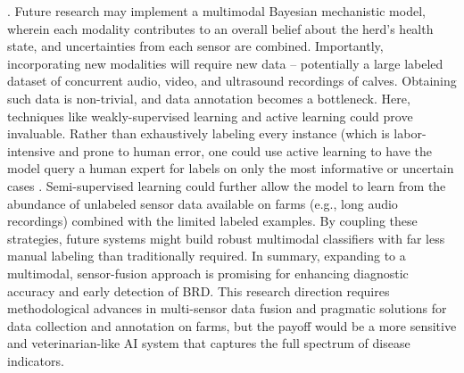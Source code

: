 \cite{carpentier2018automatic}. Future research may implement a multimodal Bayesian mechanistic model, wherein each modality contributes to an overall belief about the herd’s health state, and uncertainties from each sensor are combined. Importantly, incorporating new modalities will require new data – potentially a large labeled dataset of concurrent audio, video, and ultrasound recordings of calves. Obtaining such data is non-trivial, and data annotation becomes a bottleneck. Here, techniques like weakly-supervised learning and active learning could prove invaluable. Rather than exhaustively labeling every instance (which is labor-intensive and prone to human error, one could use active learning to have the model query a human expert for labels on only the most informative or uncertain cases \cite{gal2017deep}. Semi-supervised learning could further allow the model to learn from the abundance of unlabeled sensor data available on farms (e.g., long audio recordings) combined with the limited labeled examples. By coupling these strategies, future systems might build robust multimodal classifiers with far less manual labeling than traditionally required. In summary, expanding to a multimodal, sensor-fusion approach is promising for enhancing diagnostic accuracy and early detection of BRD. This research direction requires methodological advances in multi-sensor data fusion and pragmatic solutions for data collection and annotation on farms, but the payoff would be a more sensitive and veterinarian-like AI system that captures the full spectrum of disease indicators.

